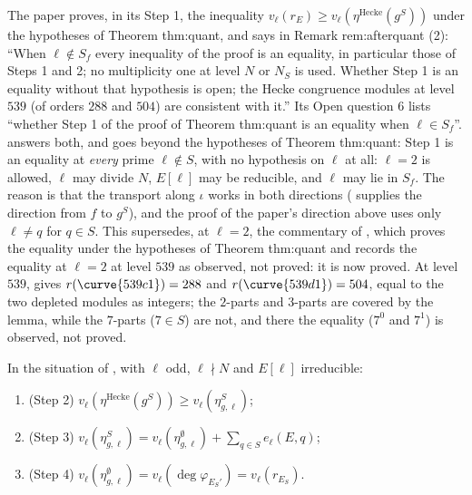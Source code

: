 \begin{remark}\label{rem:congruence:step1-commentary}
The paper proves, in its Step 1, the inequality $v_\ell(r_E)\ge v_\ell(\eta^{\mathrm{Hecke}}(g^S))$ under the hypotheses of Theorem thm:quant, and says in Remark rem:afterquant (2): ``When $\ell\notin S_f$
every inequality of the proof is an equality, in particular those of Steps 1 and 2; no multiplicity one at level $N$ or $N_S$ is used. Whether Step 1 is an equality without that hypothesis is
open; the Hecke congruence modules at level $539$ (of orders $288$ and $504$) are consistent with it.'' Its Open question 6 lists ``whether Step 1 of the proof of Theorem thm:quant is an
equality when $\ell\in S_f$''.  answers both, and goes beyond the hypotheses of Theorem thm:quant: Step 1 is an equality at \emph{every} prime $\ell\notin S$,
with no hypothesis on $\ell$ at all: $\ell=2$ is allowed, $\ell$ may divide $N$, $E[\ell]$ may be reducible, and $\ell$ may lie in $S_f$. The reason is that the transport along $\iota$ works in both
directions ( supplies the direction from $f$ to $g^S$), and the proof of the paper's direction above uses only $\ell\ne q$ for $q\in S$. This supersedes, at $\ell=2$, the
commentary of , which proves the equality under the hypotheses of Theorem thm:quant and records the equality at $\ell=2$ at level $539$ as observed, not proved: it is now
proved. At level $539$,  gives $r(\curve{539c1})=288$ and $r(\curve{539d1})=504$, equal to the two depleted modules as integers; the $2$-parts and $3$-parts are
covered by the lemma, while the $7$-parts ($7\in S$) are not, and there the equality ($7^0$ and $7^1$) is observed, not proved.
\end{remark}

\begin{lemma}[Steps 2 to 4]\label{lem:congruence:quant-steps234}
In the situation of , with $\ell$ odd, $\ell\nmid N$ and $E[\ell]$ irreducible:
\begin{enumerate}[label=(\roman*)]
\item (Step 2) $v_\ell(\eta^{\mathrm{Hecke}}(g^S))\ge v_\ell(\eta^S_{g,\ell})$;
\item (Step 3) $v_\ell(\eta^S_{g,\ell})=v_\ell(\eta^\emptyset_{g,\ell})+\sum_{q\in S}e_\ell(E,q)$;
\item (Step 4) $v_\ell(\eta^\emptyset_{g,\ell})=v_\ell(\deg\varphi_{E_S'})=v_\ell(r_{E_S})$.
\end{enumerate}
\end{lemma}

